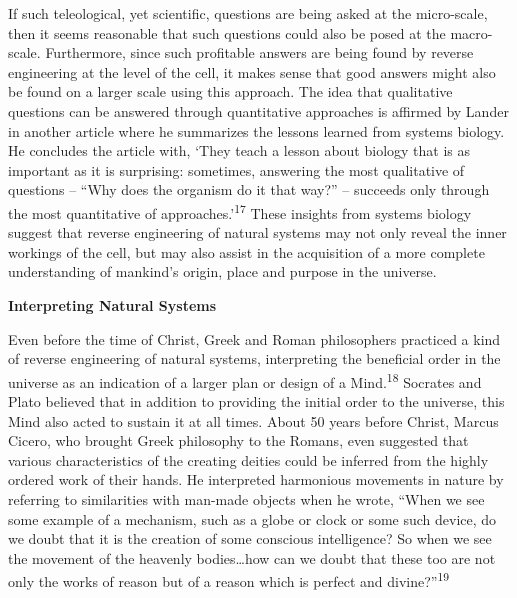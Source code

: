 If such teleological, yet scientific, questions are being asked at the
micro-scale, then it seems reasonable that such questions could also be
posed at the macro-scale. Furthermore, since such profitable answers
are being found by reverse engineering at the level of the cell, it
makes sense that good answers might also be found on a larger scale
using this approach. The idea that qualitative questions can be
answered through quantitative approaches is affirmed by Lander in
another article where he summarizes the lessons learned from systems
biology. He concludes the article with, ‘They teach a lesson about
biology that is as important as it is surprising: sometimes, answering
the most qualitative of questions – “Why does the organism do it that
way?” – succeeds only through the most quantitative of
approaches.’\textsuperscript{17} These insights from systems biology
suggest that reverse engineering of natural systems may not only reveal
the inner workings of the cell, but may also assist in the acquisition
of a more complete understanding of mankind’s origin, place and purpose
in the universe.


\bigskip


\textbf{Interpreting Natural Systems}


Even before the time of Christ, Greek and Roman philosophers practiced a
kind of reverse engineering of natural systems, interpreting the
beneficial order in the universe as an indication of a larger plan or
design of a Mind.\textsuperscript{18} Socrates and Plato believed that
in addition to providing the initial order to the universe, this Mind
also acted to sustain it at all times. About 50 years before Christ,
Marcus Cicero, who brought Greek philosophy to the Romans, even
suggested that various characteristics of the creating deities could be
inferred from the highly ordered work of their hands. He interpreted
harmonious movements in nature by referring to similarities with
man-made objects when he wrote, “When we see some example of a
mechanism, such as a globe or clock or some such device, do we doubt
that it is the creation of some conscious intelligence? So when we see
the movement of the heavenly bodies…how can we doubt that these too are
not only the works of reason but of a reason which is perfect and
divine?”\textsuperscript{19}


